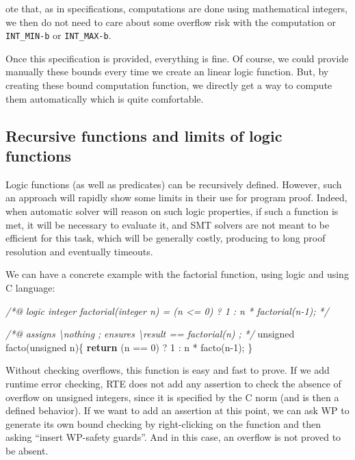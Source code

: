 \documentclass[12pt,francais,]{scrbook}
\newenvironment{Shaded}{}{}
\newcommand{\KeywordTok}[1]{\textcolor[rgb]{0.00,0.44,0.13}{\textbf{{#1}}}}
\newcommand{\DataTypeTok}[1]{\textcolor[rgb]{0.56,0.13,0.00}{{#1}}}
\newcommand{\DecValTok}[1]{\textcolor[rgb]{0.25,0.63,0.44}{{#1}}}
\newcommand{\CommentTok}[1]{\textcolor[rgb]{0.38,0.63,0.69}{\textit{{#1}}}}
\newcommand{\NormalTok}[1]{{#1}}
\newenvironment{zdsblock}[1]{%
  \tcolorbox[beamer,%
    noparskip,breakable,
    colback=LightBlue,colframe=DarkBlue,%
    colbacklower=DarkBlue,%
    title=#1]
}{\endtcolorbox}
\begin{document}
\begin{zdsblock}
  Note that, as in specifications, computations are done using mathematical
  integers, we then do not need to care about some overflow risk with the
  computation or \texttt{INT\_MIN-b} or \texttt{INT\_MAX-b}.
\end{zdsblock}
  
Once this specification is provided, everything is fine. Of course, we
could provide manually these bounds every time we create an linear logic
function. But, by creating these bound computation function, we directly
get a way to compute them automatically which is quite comfortable.

\subsection{Recursive functions and limits of logic
functions}\label{recursive-functions-and-limits-of-logic-functions}

Logic functions (as well as predicates) can be recursively defined.
However, such an approach will rapidly show some limits in their use for
program proof. Indeed, when automatic solver will reason on such logic
properties, if such a function is met, it will be necessary to evaluate
it, and SMT solvers are not meant to be efficient for this task, which
will be generally costly, producing to long proof resolution and
eventually timeouts.

We can have a concrete example with the factorial function, using logic
and using C language:

\begin{footnotesize}\begin{Shaded}
\begin{Highlighting}[]
\CommentTok{/*@}
\CommentTok{  logic integer factorial(integer n) = (n <= 0) ? 1 : n * factorial(n-1);}
\CommentTok{*/}

\CommentTok{/*@ }
\CommentTok{  assigns \textbackslash{}nothing ;}
\CommentTok{  ensures \textbackslash{}result == factorial(n) ; }
\CommentTok{*/}
\DataTypeTok{unsigned} \NormalTok{facto(}\DataTypeTok{unsigned} \NormalTok{n)\{}
  \KeywordTok{return} \NormalTok{(n == }\DecValTok{0}\NormalTok{) ? }\DecValTok{1} \NormalTok{: n * facto(n}\DecValTok{-1}\NormalTok{);}
\NormalTok{\}}
\end{Highlighting}
\end{Shaded}\end{footnotesize}

Without checking overflows, this function is easy and fast to prove. If
we add runtime error checking, RTE does not add any assertion to check
the absence of overflow on unsigned integers, since it is specified by
the C norm (and is then a defined behavior). If we want to add an
assertion at this point, we can ask WP to generate its own bound
checking by right-clicking on the function and then asking ``insert
WP-safety guards''. And in this case, an overflow is not proved to be
absent.
\end{document}
